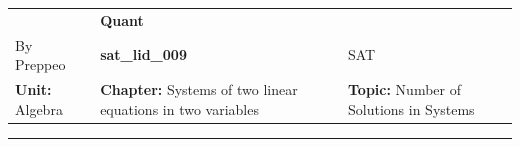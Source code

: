 \documentclass[11pt,paper=a4,answers]{exam}
\begin{document}
\begin{center}
    \centering
    \renewcommand{\arraystretch}{1.5}
    \begin{tabularx}{\textwidth}{YYY}
    & \normalsize\bf{{\Large{{Quant}}}} & \\
    By Preppeo & \normalsize\bf{{sat\_lid\_009}} & SAT\\
    \normalsize{{\textbf{{Unit:}} Algebra}} & \normalsize{{\textbf{{Chapter:}} Systems of two linear equations in two variables}} & \normalsize{{\textbf{{Topic:}} Number of Solutions in Systems}} \\
    \end{tabularx}
\end{center}
\par\noindent\rule{\textwidth}{1pt}
\end{document}
